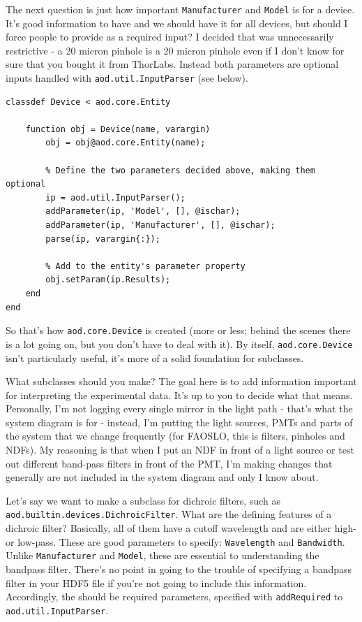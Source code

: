 \documentclass[10pt]{exam}
\newcommand\aodparam[1]{\textcolor{codepurple}{\texttt{#1}}}
\newcommand\aodclass[1]{\textcolor{codeblue}{\texttt{#1}}}
\begin{document}
		The next question is just how important \aodparam{Manufacturer} and \aodparam{Model} is for a device. It's good information to have and we should have it for all devices, but should I force people to provide as a required input? I decided that was unnecessarily restrictive - a 20 micron pinhole is a 20 micron pinhole even if I don't know for sure that you bought it from ThorLabs. Instead both parameters are optional inputs handled with \aodclass{aod.util.InputParser} (see below).
		\begin{lstlisting}[style=matlab-editor, basicstyle=\mlttfamily\footnotesize]
classdef Device < aod.core.Entity
	
	function obj = Device(name, varargin)
		obj = obj@aod.core.Entity(name);
		
		% Define the two parameters decided above, making them optional
		ip = aod.util.InputParser();
		addParameter(ip, 'Model', [], @ischar);
		addParameter(ip, 'Manufacturer', [], @ischar);
		parse(ip, varargin{:});
		
		% Add to the entity's parameter property
		obj.setParam(ip.Results);
	end
end
		\end{lstlisting}
	\noindent So that's how \aodclass{aod.core.Device} is created (more or less; behind the scenes there is a lot going on, but you don't have to deal with it). 
	By itself, \aodclass{aod.core.Device} isn't particularly useful, it's more of a solid foundation for subclasses. 
	
	What subclasses should you make? The goal here is to add information important for interpreting the experimental data. It's up to you to decide what that means. Personally, I'm not logging every single mirror in the light path - that's what the system diagram is for - instead, I'm putting the light sources, PMTs and parts of the system that we change frequently (for FAOSLO, this is filters, pinholes and NDFs). My reasoning is that when I put an NDF in front of a light source or test out different band-pass filters in front of the PMT, I'm making changes that generally are not included in the system diagram and only I know about. 
	
	Let's say we want to make a subclass for dichroic filters, such as \aodclass{aod.builtin.devices.DichroicFilter}. What are the defining features of a dichroic filter? Basically, all of them have a cutoff wavelength and are either high- or low-pass. These are good parameters to specify: \aodparam{Wavelength} and \aodparam{Bandwidth}. Unlike \aodparam{Manufacturer} and \aodparam{Model}, these are essential to understanding the bandpass filter. There's no point in going to the trouble of specifying a bandpass filter in your HDF5 file if you're not going to include this information. Accordingly, the should be required parameters, specified with \texttt{addRequired} to \aodclass{aod.util.InputParser}.
	
\end{document}
